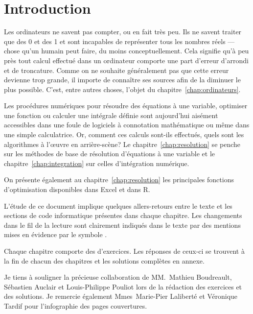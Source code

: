 \chapter*{Introduction}

Les ordinateurs ne savent pas compter, ou en fait très peu. Ils ne
savent traiter que des 0 et des 1 et sont incapables de représenter
tous les nombres réels --- chose qu'un humain peut faire, du moins
conceptuellement. Cela signifie qu'à peu près tout calcul effectué
dans un ordinateur comporte une part d'erreur d'arrondi et de
troncature. Comme on ne souhaite généralement pas que cette erreur
devienne trop grande, il importe de connaître ses sources afin de la
diminuer le plus possible. C'est, entre autres choses, l'objet du
chapitre~\ref{chap:ordinateurs}.

Les procédures numériques pour résoudre des équations à une variable,
optimiser une fonction ou calculer une intégrale définie sont
aujourd'hui aisément accessibles dans une foule de logiciels à
connotation mathématique ou même dans une simple calculatrice. Or,
comment ces calculs sont-ils effectués, quels sont les algorithmes à
l'{\oe}uvre en arrière-scène? Le chapitre~\ref{chap:resolution} se
penche sur les méthodes de base de résolution d'équations à une
variable et le chapitre~\ref{chap:integration} sur celles
d'intégration numérique.

On présente également au chapitre~\ref{chap:resolution} les
principales fonctions d'optimisation disponibles dans Excel et dans R.

L'étude de ce document implique quelques allers-retours entre le texte
et les sections de code informatique présentes dans chaque chapitre.
Les changements dans le fil de la lecture sont clairement indiqués
dans le texte par des mentions mises en évidence par le symbole
{\color{darkred}\noway}.

Chaque chapitre comporte des d'exercices. Les réponses de ceux-ci se
trouvent à la fin de chacun des chapitres et les solutions complètes
en annexe.

Je tiens à souligner la précieuse collaboration de MM.~Mathieu
Boudreault, Sébastien Auclair et Louis-Philippe Pouliot lors de la
rédaction des exercices et des solutions. Je remercie également
Mmes~Marie-Pier Laliberté et Véronique Tardif pour l'infographie des
pages couvertures.


